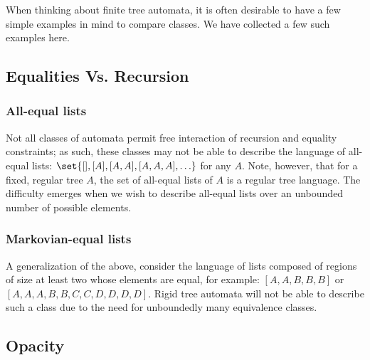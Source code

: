 When thinking about finite tree automata, it is often desirable to have a
few simple examples in mind to compare classes.  We have collected a few
such examples here.

\subsection{Equalities Vs. Recursion}

\subsubsection{All-equal lists}

Not all classes of automata permit free interaction of recursion and
equality constraints; as such, these classes may not be able to describe the
language of all-equal lists: $\set{ [], [A], [A,A], [A,A,A], \ldots }$ for
any $A$.  Note, however, that for a fixed, regular tree $A$, the set of
all-equal lists of $A$ is a regular tree language.  The difficulty emerges
when we wish to describe all-equal lists over an unbounded number of
possible elements.

\subsubsection{Markovian-equal lists}

A generalization of the above, consider the language of lists composed of
regions of size at least two whose elements are equal, for example:
$[A,A,B,B,B]$ or $[A,A,A,B,B,C,C,D,D,D,D]$.  Rigid tree automata will not be
able to describe such a class due to the need for unboundedly many
equivalence classes.

\subsection{Opacity}

